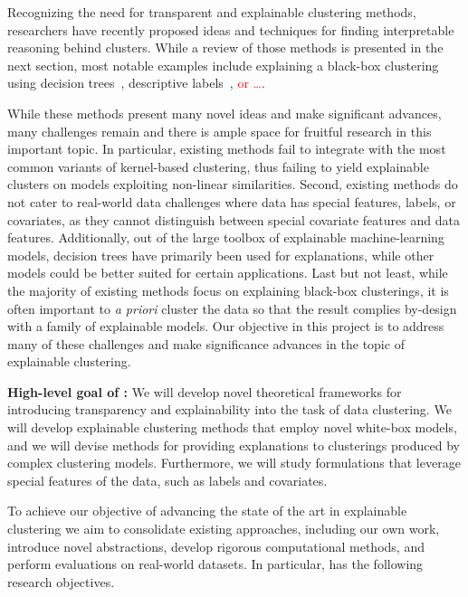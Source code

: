 \documentclass[a4paper,11pt]{article}
\begin{document}
Recognizing the need for transparent and explainable clustering methods, 
researchers have recently proposed ideas and techniques for finding 
interpretable reasoning behind clusters.
While a review of those methods is presented in the next section, 
most notable examples include 
explaining a black-box clustering using decision trees~\cite{gupta2023price,moshkovitz2020explainable},
descriptive labels~\cite{davidson2018cluster,sambaturu2020efficient}, 
\textcolor{red}{or \ldots}.

While these methods present many novel ideas and make significant advances, 
many challenges remain and there is ample space for fruitful research in this important topic. 
In particular, existing methods fail to integrate with the most common variants of kernel-based clustering, 
thus failing to yield explainable clusters on models exploiting non-linear similarities.
Second, existing methods do not cater to real-world data challenges where data has special features, 
labels, or covariates, as they cannot distinguish between special covariate features and data features.
Additionally, out of the large toolbox of explainable machine-learning models,
decision trees have primarily been used for explanations, 
while other models could be better suited for certain applications. 
Last but not least, while the majority of existing methods focus on explaining black-box clusterings, 
it is often important to \emph{a priori} cluster the data so that the result complies 
by-design with a family of explainable models.
Our objective in this project is to address many of these challenges
and make significance advances in the topic of explainable clustering.

\medskip
\noindent
\hspace{-3mm}\colorbox{verylightmagenta}{
\begin{minipage}{\textwidth}
{\bf High-level goal of \acronym:} 
We will develop novel theoretical frameworks for 
introducing transparency and explainability into the task of data clustering. 
We will develop explainable clustering methods that employ novel white-box models, 
and we will devise methods for providing explanations to clusterings produced by complex clustering models.
Furthermore, we will study formulations that leverage special features of the data,
such as labels and covariates.
\end{minipage}}

To achieve our objective of advancing the state of the art in explainable clustering
we aim to consolidate existing approaches,  including our own work,  
introduce novel abstractions, 
develop rigorous computational methods, and 
perform evaluations on real-world datasets.
In particular, {\acronym} has the following research objectives. 
\end{document}
